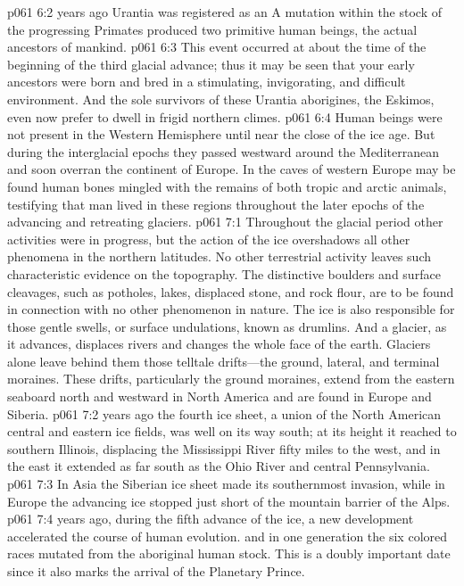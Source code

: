 \pc \vs p061 6:2  years ago Urantia was registered as an  A mutation within the stock of the progressing Primates  produced two primitive human beings, the actual ancestors of mankind.
\vs p061 6:3 This event occurred at about the time of the beginning of the third glacial advance; thus it may be seen that your early ancestors were born and bred in a stimulating, invigorating, and difficult environment. And the sole survivors of these Urantia aborigines, the Eskimos, even now prefer to dwell in frigid northern climes.
\pc \vs p061 6:4 Human beings were not present in the Western Hemisphere until near the close of the ice age. But during the interglacial epochs they passed westward around the Mediterranean and soon overran the continent of Europe. In the caves of western Europe may be found human bones mingled with the remains of both tropic and arctic animals, testifying that man lived in these regions throughout the later epochs of the advancing and retreating glaciers.
\vs p061 7:1 Throughout the glacial period other activities were in progress, but the action of the ice overshadows all other phenomena in the northern latitudes. No other terrestrial activity leaves such characteristic evidence on the topography. The distinctive boulders and surface cleavages, such as potholes, lakes, displaced stone, and rock flour, are to be found in connection with no other phenomenon in nature. The ice is also responsible for those gentle swells, or surface undulations, known as drumlins. And a glacier, as it advances, displaces rivers and changes the whole face of the earth. Glaciers alone leave behind them those telltale drifts---the ground, lateral, and terminal moraines. These drifts, particularly the ground moraines, extend from the eastern seaboard north and westward in North America and are found in Europe and Siberia.
\pc \vs p061 7:2  years ago the fourth ice sheet, a union of the North American central and eastern ice fields, was well on its way south; at its height it reached to southern Illinois, displacing the Mississippi River fifty miles to the west, and in the east it extended as far south as the Ohio River and central Pennsylvania.
\vs p061 7:3 In Asia the Siberian ice sheet made its southernmost invasion, while in Europe the advancing ice stopped just short of the mountain barrier of the Alps.
\pc \vs p061 7:4  years ago, during the fifth advance of the ice, a new development accelerated the course of human evolution.  and in one generation the six colored races mutated from the aboriginal human stock. This is a doubly important date since it also marks the arrival of the Planetary Prince.
